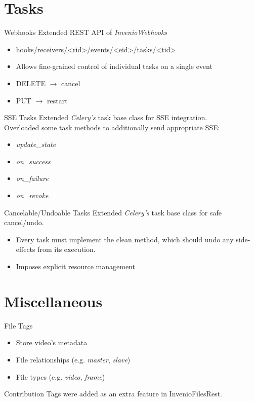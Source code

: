 \documentclass{beamer}
\begin{document}
	\section{Tasks}
	\begin{frame}{Webhooks}
    	  Extended REST API of \emph{InvenioWebhooks}
    	  \begin{itemize}
    	    \item{\url{hooks/receivers/<rid>/events/<eid>/tasks/<tid>}}
    	    \item{Allows fine-grained control of individual tasks on a single event}
    	    \item{\alert{DELETE} $\rightarrow$ cancel}
    	    \item{\alert{PUT} $\rightarrow$ restart}
      \end{itemize}
	\end{frame}
	\begin{frame}{SSE Tasks}
      	Extended \textit{Celery's} task base class for SSE integration. \\
      	\vfill
      	Overloaded some task methods to additionally send appropriate SSE:
  	    \begin{itemize}
    	    \item{\textit{update_state}}
    	    \item{\textit{on_success}}
    	    \item{\textit{on_failure}}
    	    \item{\textit{on_revoke}}
  	    \end{itemize}
	\end{frame}
	
	\begin{frame}{Cancelable/Undoable Tasks}
	  Extended \textit{Celery's} task base class for safe cancel/undo. \\
	  \begin{itemize}
	    \item{Every task must implement the \alert{clean} method}, which should undo any side-effects from its execution.
	    \item{Imposes explicit resource management}
	  \end{itemize}
	\end{frame}

  \section{Miscellaneous}
  	\begin{frame}{File Tags}
    	\begin{itemize}
    	  \item{Store video's metadata}
    	  \item{File relationships (e.g. \textit{master}, \emph{slave})}
    	  \item{File types (e.g. \emph{video}, \emph{frame})}
	  \end{itemize}
	  \vfill
	  \begin{alertblock}{Contribution}
		  Tags were added as an extra feature in \alert{InvenioFilesRest}.
    	\end{alertblock}
	\end{frame}
\end{document}
